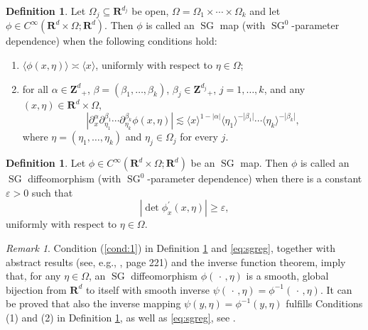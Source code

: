 \documentclass[12pt,a4paper,reqno]{amsart}
\numberwithin{equation}{section}
\numberwithin{thm}{section}
\theoremstyle{definition}
\newtheorem{defn}[thm]{Definition}
\theoremstyle{remark}
\newtheorem{rem}[thm]{Remark}
\begin{document}
\par

\begin{defn}\label{def:sgmap}
Let $\Omega _j \subseteq {\mathbf R^{{d_j}}}$ be open, $\Omega =
\Omega _1\times \cdots \times \Omega _k$ and let
$\phi \in C^\infty ({\mathbf R^{d}}\times \Omega ;{\mathbf R^{d}})$. Then $\phi$ is
called an ${\operatorname{SG}}$ map (with ${\operatorname{SG}}
^0$-parameter dependence) when the following conditions hold:
\begin{enumerate}
		\item \label{cond:1}
	${\langle{\phi(x,\eta )}\rangle}\asymp {\langle{x}\rangle}$, 
	uniformly with respect to $\eta \in \Omega$;
		\item for all $\alpha \in {\mathbf{Z}^{{d}}}_+$, $\beta =
	(\beta _1,\dots ,\beta _k)$, $\beta _j \in {\mathbf{Z}^{{d_j}}}_+$,
	$j=1,\dots, k$,
	and any $(x,\eta )\in {\mathbf R^{{d}}} \times \Omega$,
		\[
		|\partial ^\alpha _x\partial ^{\beta _1}_{\eta _1}\cdots  \partial
		^{\beta _k}_{\eta _k}\phi(x,\eta )|
		\lesssim
		{\langle{x}\rangle}^{1-|\alpha |}{\langle{\eta _1}\rangle}^{-|\beta _1|}\cdots
		{\langle{\eta _k}\rangle}^{-|\beta _k|},
	\]
	where $\eta =(\eta _1,\dots ,\eta _k)$ and $\eta _j\in \Omega _j$ for every
$j$.
\end{enumerate}
\end{defn}

\par

\begin{defn}\label{def:sgdiffeo}
Let $\phi \in C^\infty ({\mathbf R^{{d}}}\times \Omega ;{\mathbf R^{d}} )$ be an ${\operatorname{SG}}$
map. Then $\phi$ is called an ${\operatorname{SG}}$
diffeomorphism (with ${\operatorname{SG}}^0$-parameter dependence) when
there is a constant $\varepsilon>0$ such that
\begin{equation}\label{eq:sgreg}
	|\det \phi ^\prime _x(x,\eta )|\ge\varepsilon,
\end{equation}
uniformly with respect to $\eta \in \Omega$.
\end{defn}
\begin{rem}
		Condition (\ref{cond:1}) in Definition \ref{def:sgmap} and
	\eqref{eq:sgreg}, together with abstract results
	(see, e.g., \cite{Berger}, page 221) and the inverse function
	theorem, imply that,
	for any $\eta \in \Omega$, an ${\operatorname{SG}}$ diffeomorphism
	$\phi({\, \cdot \, } ,\eta )$ is a smooth, global bijection from
	${\mathbf R^{{d}}}$ to itself with smooth inverse $\psi({\, \cdot \, } ,\eta )
	=\phi ^{-1}({\, \cdot \, } ,\eta )$.
	It can be proved that also the inverse mapping
	$\psi (y,\eta )=\phi ^{-1}(y,\eta )$ fulfills Conditions
	(1) and (2) in Definition \ref{def:sgmap}, 
	as well as \eqref{eq:sgreg}, see \cite{coriasco}.
\end{rem}
\end{document}
